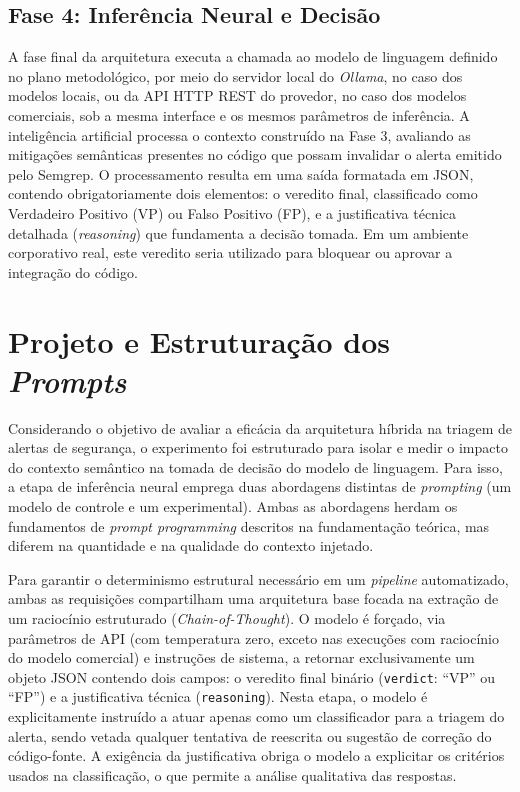 \subsection{Fase 4: Inferência Neural e Decisão}
A fase final da arquitetura executa a chamada ao modelo de linguagem definido no plano metodológico, por meio do servidor local do \textit{Ollama}, no caso dos modelos locais, ou da API HTTP REST do provedor, no caso dos modelos comerciais, sob a mesma interface e os mesmos parâmetros de inferência. A inteligência artificial processa o contexto construído na Fase 3, avaliando as mitigações semânticas presentes no código que possam invalidar o alerta emitido pelo Semgrep. O processamento resulta em uma saída formatada em JSON, contendo obrigatoriamente dois elementos: o veredito final, classificado como Verdadeiro Positivo (VP) ou Falso Positivo (FP), e a justificativa técnica detalhada (\textit{reasoning}) que fundamenta a decisão tomada. Em um ambiente corporativo real, este veredito seria utilizado para bloquear ou aprovar a integração do código.

\section{Projeto e Estruturação dos \textit{Prompts}}
\label{sec:prompts}
Considerando o objetivo de avaliar a eficácia da arquitetura híbrida na triagem de alertas de segurança, o experimento foi estruturado para isolar e medir o impacto do contexto semântico na tomada de decisão do modelo de linguagem. Para isso, a etapa de inferência neural emprega duas abordagens distintas de \textit{prompting} (um modelo de controle e um experimental). Ambas as abordagens herdam os fundamentos de \textit{prompt programming} descritos na fundamentação teórica, mas diferem na quantidade e na qualidade do contexto injetado.

Para garantir o determinismo estrutural necessário em um \textit{pipeline} automatizado, ambas as requisições compartilham uma arquitetura base focada na extração de um raciocínio estruturado (\textit{Chain-of-Thought}). O modelo é forçado, via parâmetros de API (com temperatura zero, exceto nas execuções com raciocínio do modelo comercial) e instruções de sistema, a retornar exclusivamente um objeto JSON contendo dois campos: o veredito final binário (\texttt{verdict}: ``VP'' ou ``FP'') e a justificativa técnica (\texttt{reasoning}). Nesta etapa, o modelo é explicitamente instruído a atuar apenas como um classificador para a triagem do alerta, sendo vetada qualquer tentativa de reescrita ou sugestão de correção do código-fonte. A exigência da justificativa obriga o modelo a explicitar os critérios usados na classificação, o que permite a análise qualitativa das respostas.

